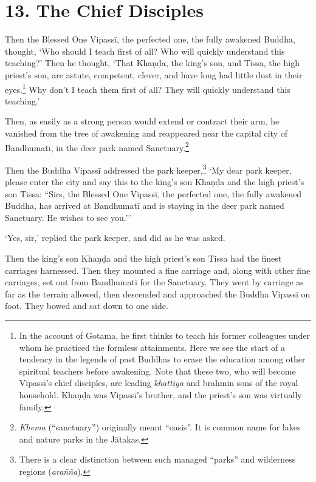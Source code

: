 \documentclass[12pt,openany]{book}%
\begin{document}
\section*{13. The Chief Disciples }

Then the Blessed One \textsanskrit{Vipassī}, the perfected one, the fully awakened Buddha, thought, ‘Who should I teach first of all? Who will quickly understand this teaching?’ Then he thought, ‘That \textsanskrit{Khaṇḍa}, the king’s son, and Tissa, the high priest’s son, are astute, competent, clever, and have long had little dust in their eyes.\footnote{In the account of Gotama, he first thinks to teach his former colleagues under whom he practiced the formless attainments. Here we see the start of a tendency in the legends of past Buddhas to erase the education among other spiritual teachers before awakening. Note that these two, who will become \textsanskrit{Vipassī}’s chief disciples, are leading \textit{khattiya} and brahmin sons of the royal household. \textsanskrit{Khaṇḍa} was \textsanskrit{Vipassī}’s brother, and the priest’s son was virtually family. } Why don’t I teach them first of all? They will quickly understand this teaching.’ 

Then, as easily as a strong person would extend or contract their arm, he vanished from the tree of awakening and reappeared near the capital city of \textsanskrit{Bandhumatī}, in the deer park named Sanctuary.\footnote{\textit{Khema} (“sanctuary”) originally meant “oasis”. It is common name for lakes and nature parks in the \textsanskrit{Jātakas}. } 

Then the Buddha \textsanskrit{Vipassī} addressed the park keeper,\footnote{There is a clear distinction between such managed “parks” and wilderness regions (\textit{\textsanskrit{arañña}}). } ‘My dear park keeper, please enter the city and say this to the king’s son \textsanskrit{Khaṇḍa} and the high priest’s son Tissa: “Sirs, the Blessed One \textsanskrit{Vipassī}, the perfected one, the fully awakened Buddha, has arrived at \textsanskrit{Bandhumatī} and is staying in the deer park named Sanctuary. He wishes to see you.”’ 

‘Yes, sir,’ replied the park keeper, and did as he was asked. 

Then the king’s son \textsanskrit{Khaṇḍa} and the high priest’s son Tissa had the finest carriages harnessed. Then they mounted a fine carriage and, along with other fine carriages, set out from \textsanskrit{Bandhumatī} for the Sanctuary. They went by carriage as far as the terrain allowed, then descended and approached the Buddha \textsanskrit{Vipassī} on foot. They bowed and sat down to one side. 
\end{document}
